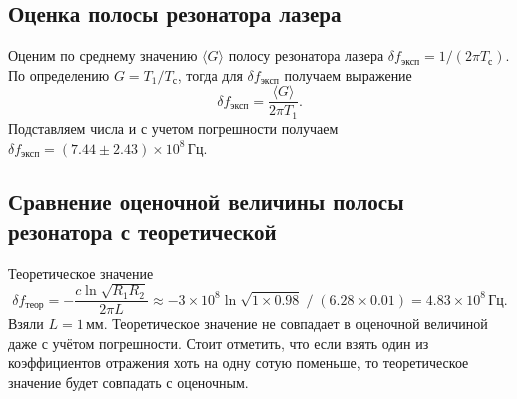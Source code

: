 \documentclass[12pt]{article}
\begin{document}
	\subsection{Оценка полосы резонатора лазера}

	Оценим по среднему значению $\langle G \rangle$ полосу резонатора лазера $\delta f_\text{эксп} = 1/(2\pi T_\text{с})$. По определению $G = T_1 / T_\text{с}$, тогда для $\delta f_\text{эксп}$ получаем выражение
	\begin{equation}
		\delta f_\text{эксп} = \frac{\langle G \rangle}{2\pi T_1}.
	\end{equation}
	Подставляем числа и с учетом погрешности получаем $\delta f_\text{эксп} = (7.44\pm2.43)\times10^8\,\text{Гц}$.

	\subsection{Сравнение оценочной величины полосы резонатора с теоретической}
	Теоретическое значение $$\delta f_\text{теор} = -\frac{c \ln{\sqrt{R_1 R_2}}}{2\pi L} \approx - 3\times10^8 \ln{\sqrt{1\times 0.98}}\; /\;(6.28 \times 0.01) = 4.83\times10^8\,\text{Гц}.$$ Взяли $L=1\,\text{мм}$. Теоретическое значение не совпадает в оценочной величиной даже с учётом погрешности. Стоит отметить, что если взять один из коэффициентов отражения хоть на одну сотую поменьше, то теоретическое значение будет совпадать с оценочным.
\end{document}
